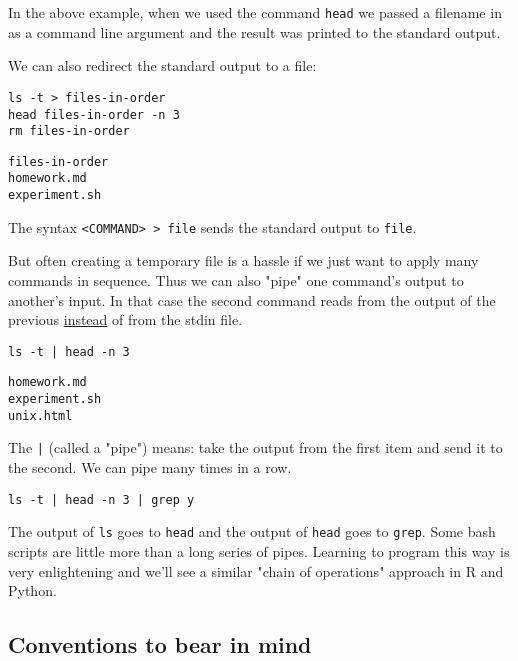 \documentclass[11pt]{article}
\begin{document}
In the above example, when we used the command \texttt{head} we passed a
filename in as a command line argument and the result was printed to
the standard output.

We can also redirect the standard output to a file:

\begin{verbatim}
ls -t > files-in-order
head files-in-order -n 3
rm files-in-order
\end{verbatim}

\begin{verbatim}
files-in-order
homework.md
experiment.sh
\end{verbatim}

The syntax \texttt{<COMMAND> > file} sends the standard output to \texttt{file}.

But often creating a temporary file is a hassle if we just want to
apply many commands in sequence. Thus we can also "pipe" one command's
output to another's input. In that case the second command reads from
the output of the previous \uline{instead} of from the stdin file.

\begin{verbatim}
ls -t | head -n 3
\end{verbatim}

\begin{verbatim}
homework.md
experiment.sh
unix.html
\end{verbatim}

The \texttt{|} (called a "pipe") means: take the output from the first item
and send it to the second. We can pipe many times in a row.

\begin{verbatim}
ls -t | head -n 3 | grep y
\end{verbatim}

The output of \texttt{ls} goes to \texttt{head} and the output of \texttt{head} goes to
\texttt{grep}. Some bash scripts are little more than a long series of
pipes. Learning to program this way is very enlightening and we'll see
a similar "chain of operations" approach in R and Python.

\subsection{Conventions to bear in mind}
\label{sec:org78bfd1a}
\end{document}
